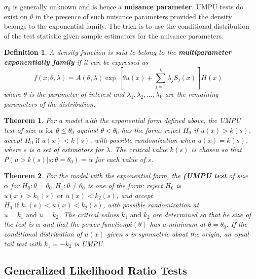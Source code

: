 \documentclass{article}
\newtheorem{definition}{Definition}[section]
\newtheorem{theorem}{Theorem}[section]
\begin{document}
\(\sigma_0\) is generally unknown and is hence a \textbf{nuisance parameter}. UMPU tests do exist on \(\theta\) in the presence of such nuisance parameters provided the density belongs to the exponential family. The trick is to use the conditional distribution of the test statistic given sample estimators for the nuisance parameters.

\begin{definition}
    A density function is said to belong to the \textbf{multiparameter exponentially family} if it can be expressed as
    \begin{equation*}
        f(x;\theta,\lambda)=A(\theta,\lambda) \exp{\left[\theta u(x)+\sum_{j=1}^{k} \lambda_j S_j(x)\right]} H(x)
    \end{equation*}
    where \(\theta\) is the parameter of interest and \(\lambda_1,\lambda_2,\dots,\lambda_k\) are the remaining parameters of the distribution.
\end{definition}

\begin{theorem}
    For a model with the exponential form defined above, the UMPU test of size \(\alpha \text{ for } \theta \leq \theta_0\) against \(\theta <\theta_0\) has the form: reject \(H_0\) if \(u(x)>k(s)\), accept \(H_0 \text{ if } u(x)<k(s)\), with possible randomization when \(u(x)=k(s)\), where $s$ is a set of estimators for \(\lambda\). The critical value \(k(s)\) is chosen so that \(P(u>k(s)|s;\theta=\theta_0)=\alpha\) for each value of $s$.
\end{theorem}

\begin{theorem}
    For the model with the exponential form, the \textbf{(UMPU test} of size \(\alpha\) for \(H_0:\theta=\theta_0,H_1:\theta \neq \theta_0\) is one of the form: reject \(H_0\) is \(u(x)>k_1(s) \text{ or } u(x)<k_2(s)\), and accept \(H_0 \text{ if } k_1(s)<u(x)<k_2(s)\), with possible randomization at \(u=k_1 \text{ and } u=k_2\). The critical values \(k_1 \text{ and } k_2\) are determined so that he size of the test is $\alpha$ and that the power function\(pi(\theta)\) has a minimum at \(\theta=\theta_0\). If the conditional distribution of \(u(x)\) given $s$ is symmetric about the origin, an equal tail test with \(k_1=-k_2\) is UMPU.
    \end{theorem}

\subsection{Generalized Likelihood Ratio Tests}
\end{document}
